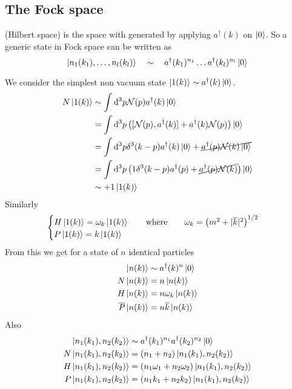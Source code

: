 \subsection{The Fock space}(Hilbert space) is the space with  generated by applying $a^\dagger(k)$ on $\left| 0 \right\rangle$. So a generic state in Fock space can be written as
\[ \left| n_1(k_1), \ldots, n_l(k_l) \right\rangle\quad \sim \quad a^\dagger(k_1)^{n_1} \ldots a^\dagger(k_l)^{n_l} \left| 0 \right\rangle \]

\begin{example}
We consider the simplest non vacuum state $\left| 1(k) \right\rangle \sim a^\dagger(k)\left| 0 \right\rangle$.
\begin{align*}
N\left| 1(k) \right\rangle &\sim \int \operatorname{d \!}{^3p}\mathcal{N}(p)a^\dagger(k)\left| 0 \right\rangle \\
&= \int \operatorname{d \!}{^3p}\left([\mathcal{N}(p),a^\dagger(k)] + a^\dagger(k)\mathcal{N}(p)\right)\left| 0 \right\rangle \\
&= \int \operatorname{d \!}{^3p} \delta^3(k-p)a^\dagger(k)\left| 0 \right\rangle + \cancel{a^\dagger(p)\mathcal{N}(k)\left| 0 \right\rangle} \\
&= \int \operatorname{d \!}{^3p} \left(1\delta^3(k- p)a^\dagger(p) + \cancel{a^\dagger(p)\mathcal{N}(k)}\right)\left| 0 \right\rangle \\
&\sim +1 \left| 1(k) \right\rangle
\end{align*}
Similarly
\[ \begin{cases}
H\left| 1(k) \right\rangle = \omega_k\left| 1(k) \right\rangle \qquad \text{where} \qquad \omega_k = \left(m^2 + |\overline{k}|^2\right)^{1/2} \\
P\left| 1(k) \right\rangle = k\left| 1(k) \right\rangle
\end{cases} \]
From this we get for a state of $n$ identical particles
\begin{align*}
\left| n(k) \right\rangle &\sim a^\dagger(k)^n\left| 0 \right\rangle\\
N\left| n(k) \right\rangle &= n\left| n(k) \right\rangle \\
H\left| n(k) \right\rangle &= n\omega_k\left| n(k) \right\rangle\\
\overline{P}\left| n(k) \right\rangle &= n \overline{k} \left| n(k) \right\rangle
\end{align*}
Also
\begin{align*}
\left| n_1(k_1), n_2(k_2) \right\rangle &\sim a^\dagger(k_1)^{n_1}a^\dagger(k_2)^{n_2}\left| 0 \right\rangle\\
N\left| n_1(k_1), n_2(k_2) \right\rangle &= (n_1+n_2)\left| n_1(k_1), n_2(k_2) \right\rangle \\
H\left| n_1(k_1), n_2(k_2) \right\rangle &= (n_1\omega_1+n_2\omega_2)\left| n_1(k_1), n_2(k_2) \right\rangle \\
P\left| n_1(k_1), n_2(k_2) \right\rangle &= (n_1k_1+n_2k_2)\left| n_1(k_1), n_2(k_2) \right\rangle
\end{align*}
\end{example}

